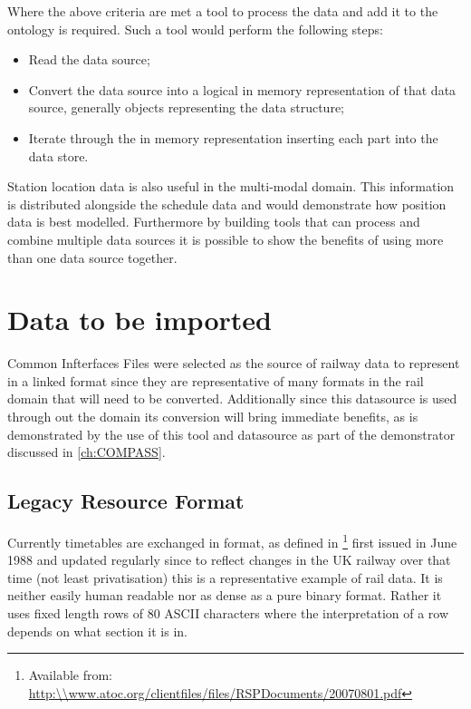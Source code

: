 Where the above criteria are met a tool to process the data and add it to the ontology is required. Such a tool would perform the following steps:

 \begin{itemize}
	\item Read the data source;
	\item Convert the data source into a logical in memory representation of that data source, generally objects representing the data structure;
	\item Iterate through the in memory representation inserting each part into the data store.
\end{itemize}

Station location data is also useful in the multi-modal domain. This information is distributed alongside the schedule data and would demonstrate how position data is best modelled. Furthermore by building tools that can process and combine multiple data sources it is possible to show the benefits of using more than one data source together. 

\section{Data to be imported}

Common Infterfaces Files were selected as the source of railway data to represent in a linked format since they are representative of many formats in the rail domain that will need to be converted. Additionally since this datasource is used through out the domain its conversion will bring immediate benefits, as is demonstrated by the use of this tool and datasource as part of the demonstrator discussed in \autoref{ch:COMPASS}. 

\subsection{Legacy Resource Format}
\label{sec:datatoimport}
Currently timetables are exchanged in  format, as defined in \citep{nr2007}\footnote{Available from: \url{http:\\www.atoc.org/clientfiles/files/RSPDocuments/20070801.pdf}} first issued in June 1988 and updated regularly since to reflect changes in the UK railway over that time (not least privatisation) this is a representative example of rail data. It is neither easily human readable nor as dense as a pure binary format. Rather it uses fixed length rows of 80 ASCII characters where the interpretation of a row depends on what section it is in.

